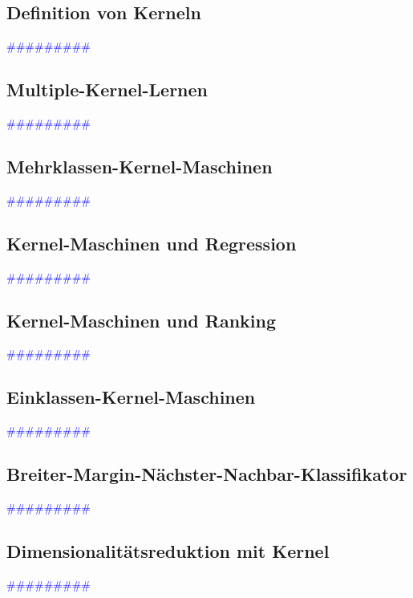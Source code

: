\documentclass{article}
\begin{document}
  \subsection{Definition von Kerneln} %
      \textcolor{blue}{\#\#\#\#\#\#\#\#\#}
  \subsection{Multiple-Kernel-Lernen} %
      \textcolor{blue}{\#\#\#\#\#\#\#\#\#}
  \subsection{Mehrklassen-Kernel-Maschinen} %
      \textcolor{blue}{\#\#\#\#\#\#\#\#\#}
  \subsection{Kernel-Maschinen und Regression} %
      \textcolor{blue}{\#\#\#\#\#\#\#\#\#}
  \subsection{Kernel-Maschinen und Ranking} %
      \textcolor{blue}{\#\#\#\#\#\#\#\#\#}
  \subsection{Einklassen-Kernel-Maschinen} %
      \textcolor{blue}{\#\#\#\#\#\#\#\#\#}
  \subsection{Breiter-Margin-Nächster-Nachbar-Klassifikator} %
      \textcolor{blue}{\#\#\#\#\#\#\#\#\#}
  \subsection{Dimensionalitätsreduktion mit Kernel} %
      \textcolor{blue}{\#\#\#\#\#\#\#\#\#}
\end{document}
